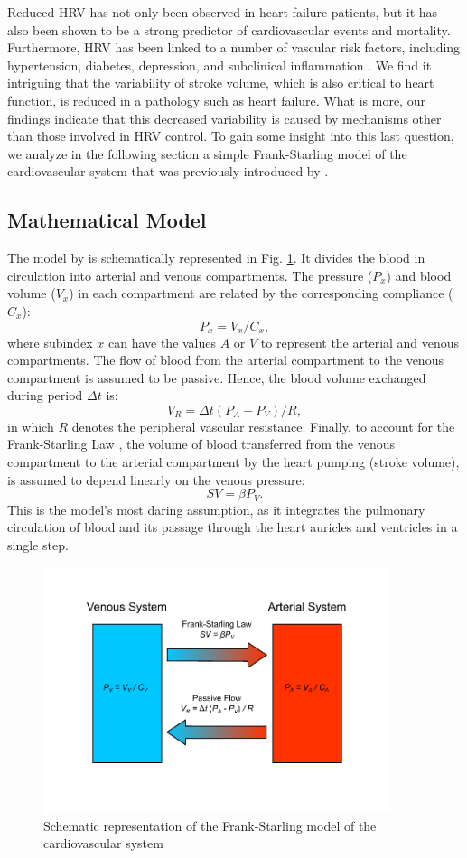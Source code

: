 \documentclass[%
preprint,
 amsmath,amssymb,
 aps,
]{revtex4-2}
\begin{document}
Reduced HRV has not only been observed in heart failure patients, but it has also been shown to be a strong predictor of cardiovascular events and mortality. Furthermore, HRV has been linked to a number of vascular risk factors, including hypertension, diabetes, depression, and subclinical inflammation \citep{Zeki_Al_Hazzouri_2014}. We find it intriguing that the variability of stroke volume, which is also critical to heart function, is reduced in a pathology such as heart failure. What is more, our findings indicate that this decreased variability is caused by mechanisms other than those involved in HRV control. To gain some insight into this last question, we analyze in the following section a simple Frank-Starling model of the cardiovascular system that was previously introduced by \citet{Upton_2005}.

\subsection{Mathematical Model}

The model by \citeauthor{Upton_2005} is schematically represented in Fig. \ref{fig:model}. It divides the blood in circulation into arterial and venous compartments. The pressure ($P_x$) and blood volume ($V_x$) in each compartment are related by the corresponding compliance ($C_x$):
\[
    P_x = V_x / C_x,
\] 
where subindex $x$ can have the values $A$ or $V$ to represent the arterial and venous compartments. The flow of blood from the arterial compartment to the venous compartment is assumed to be passive. Hence, the blood volume exchanged during period $\Delta t$ is:
\[
    V_R = \Delta t (P_A - P_V) / R,
\]
in which $R$ denotes the peripheral vascular resistance. Finally, to account for the Frank-Starling Law \citep{Jacob_1992}, the volume of blood transferred from the venous compartment to the arterial compartment by the heart pumping (stroke volume), is assumed to depend linearly on the venous pressure:
\[
    SV = \beta P_V.
\]
This is the model's most daring assumption, as it integrates the pulmonary circulation of blood and its passage through the heart auricles and ventricles in a single step.

\begin{figure}
\includegraphics[width=4in]{model.pdf}
\caption{Schematic representation of the Frank-Starling model of the cardiovascular system}
\label{fig:model}
\end{figure}
\end{document}
